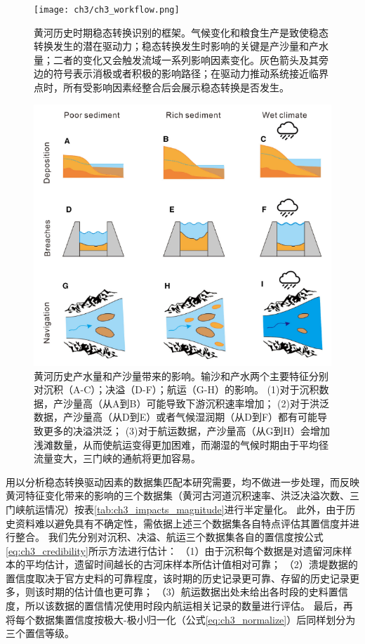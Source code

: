 \begin{figure}[htb] %
    \centering
    \texttt{[image: ch3/ch3\_workflow.png]}
    \caption[黄河历史时期稳态转换识别的框架]{黄河历史时期稳态转换识别的框架。气候变化和粮食生产是致使稳态转换发生的潜在驱动力；稳态转换发生时影响的关键是产沙量和产水量；二者的变化又会触发流域一系列影响因素变化。灰色箭头及其旁边的符号表示消极或者积极的影响路径；在驱动力推动系统接近临界点时，所有受影响因素经整合后会展示稳态转换是否发生。}
    \label{fig:ch3_regime_shift_detect}
\end{figure}

\begin{figure}[htb] %
    \centering
    \includegraphics[width=\textwidth]{img/ch3/ch3_impacts_diagram.png}
    \caption[黄河历史产水量和产沙量带来的影响]{黄河历史产水量和产沙量带来的影响。输沙和产水两个主要特征分别对沉积（A-C）；决溢（D-F）；航运（G-H）的影响。
    (1)对于沉积数据，产沙量高（从A到B）可能导致下游沉积速率增加\cite{xu2003a}；
    (2)对于洪泛数据，产沙量高（从D到E）或者气候湿润期（从D到F）都有可能导致更多的决溢洪泛\cite{chen2012}；
    (3)对于航运数据，产沙量高（从G到H）会增加浅滩数量，从而使航运变得更加困难，而潮湿的气候时期由于平均径流量变大，三门峡的通航将更加容易\cite{WangShouChun1993}。}
    \label{fig:ch3_impacts}
\end{figure}

用以分析稳态转换驱动因素的数据集匹配本研究需要，均不做进一步处理，而反映黄河特征变化带来的影响的三个数据集（黄河古河道沉积速率、洪泛决溢次数、三门峡航运情况）按表\ref{tab:ch3_impacts_magnitude}进行半定量化。
此外，由于历史资料难以避免具有不确定性，需依据上述三个数据集各自特点评估其置信度并进行整合。
我们先分别对沉积、决溢、航运三个数据集各自的置信度按公式\ref{eq:ch3_credibility}所示方法进行估计：
（1）由于沉积每个数据是对遗留河床样本的平均估计，遗留时间越长的古河床样本所估计值相对可靠；
（2）溃堤数据的置信度取决于官方史料的可靠程度，该时期的历史记录更可靠、存留的历史记录更多，则该时期的估计值也更可靠；
（3）航运数据出处未给出各时段的史料置信度，所以该数据的置信情况使用时段内航运相关记录的数量进行评估。
最后，再将每个数据集置信度按极大-极小归一化（公式\ref{eq:ch3_normalize}）后同样划分为三个置信等级。

